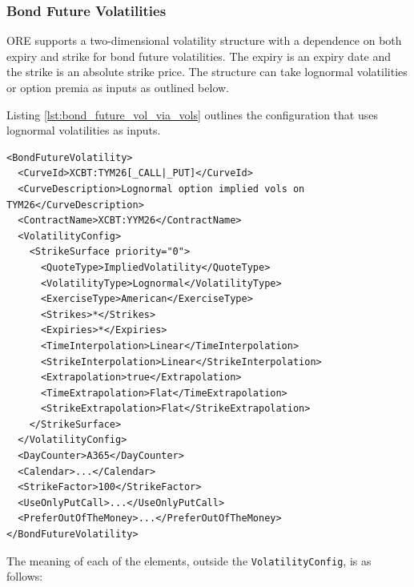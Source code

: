 \subsubsection{Bond Future Volatilities}

ORE supports a two-dimensional volatility structure with a dependence on both expiry and strike for bond future 
volatilities. The expiry is an expiry date and the strike is an absolute strike price. The structure can take 
lognormal volatilities or option premia as inputs as outlined below.

Listing \ref{lst:bond_future_vol_via_vols} outlines the configuration that uses lognormal volatilities as inputs.

\begin{longlisting}
\begin{verbatim}
<BondFutureVolatility>
  <CurveId>XCBT:TYM26[_CALL|_PUT]</CurveId>
  <CurveDescription>Lognormal option implied vols on TYM26</CurveDescription>
  <ContractName>XCBT:YYM26</ContractName>
  <VolatilityConfig>
    <StrikeSurface priority="0">
      <QuoteType>ImpliedVolatility</QuoteType>
      <VolatilityType>Lognormal</VolatilityType>
      <ExerciseType>American</ExerciseType>
      <Strikes>*</Strikes>
      <Expiries>*</Expiries>
      <TimeInterpolation>Linear</TimeInterpolation>
      <StrikeInterpolation>Linear</StrikeInterpolation>
      <Extrapolation>true</Extrapolation>
      <TimeExtrapolation>Flat</TimeExtrapolation>
      <StrikeExtrapolation>Flat</StrikeExtrapolation>
    </StrikeSurface>
  </VolatilityConfig>
  <DayCounter>A365</DayCounter>
  <Calendar>...</Calendar>
  <StrikeFactor>100</StrikeFactor>
  <UseOnlyPutCall>...</UseOnlyPutCall>
  <PreferOutOfTheMoney>...</PreferOutOfTheMoney>
</BondFutureVolatility>
\end{verbatim}
\caption{Bond future option surface using volatilities}
\label{lst:bond_future_vol_via_vols}
\end{longlisting}

The meaning of each of the elements, outside the \lstinline!VolatilityConfig!, is as follows:

